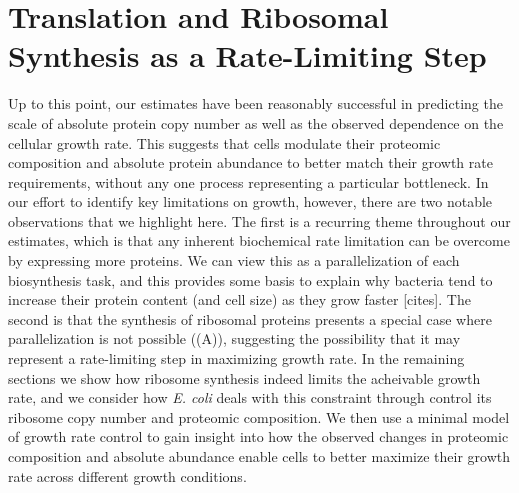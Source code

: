 \section{Translation and Ribosomal Synthesis as a Rate-Limiting Step}
Up to this point, our estimates have been reasonably successful in predicting
the scale of absolute protein copy number as well as the observed dependence on
the cellular growth rate. This suggests that cells modulate their proteomic
composition and absolute protein abundance to better match their growth rate
requirements, without any one process representing a particular bottleneck. In
our effort to identify key limitations on growth, however, there are two notable
observations that we highlight here. The first is a recurring theme throughout
our estimates, which is that any inherent biochemical rate limitation can be
overcome by expressing more proteins. We can view this as a parallelization of
each biosynthesis task, and this provides some basis to explain why bacteria
tend to increase their protein content (and cell size) as they grow faster
[cites]. The second is that the synthesis of ribosomal proteins presents a
special case where parallelization is not possible ((A)),
suggesting the possibility that it may represent a rate-limiting step in
maximizing growth rate. In the remaining sections we show how ribosome synthesis
indeed limits the acheivable growth rate, and we consider how \textit{E. coli}
deals with this constraint through control its ribosome copy number and
proteomic composition.  We then use a minimal model of growth rate control to
gain insight into how the observed changes in proteomic composition and absolute
abundance enable cells to better maximize their growth rate across different
growth conditions.



